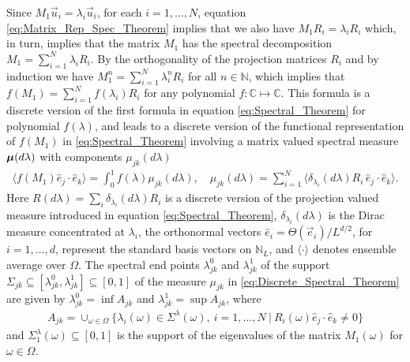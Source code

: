 \documentclass{cmslatex}
\newcommand\bmu{\mbox{\boldmath${\mu}$}}
\begin{document}
Since $M_1\vec{u}_i=\lambda_i\vec{u}_i$, for each $i=1,\ldots,N$, equation
\eqref{eq:Matrix_Rep_Spec_Theorem} implies that we also have
$M_1R_i=\lambda_iR_i$ which, in turn, implies that the matrix  $M_1$ has the
spectral decomposition $M_1=\sum_{i=1}^N\lambda_iR_i$. By the orthogonality of
the projection matrices $R_i$ and by induction we have
$M_1^n=\sum_{i=1}^N\lambda_i^nR_i$ for all $n\in\mathbb{N}$, which implies that
$f(M_1)=\sum_{i=1}^Nf(\lambda_i)R_i$ for any polynomial
$f:\mathbb{C}\mapsto\mathbb{C}$.  This formula is a discrete version of the
first formula in equation \eqref{eq:Spectral_Theorem} for polynomial
$f(\lambda)$, and leads to a discrete version of the functional
representation of  $f(M_1)$ in \eqref{eq:Spectral_Theorem} involving a
matrix valued spectral measure $\bmu(d\lambda)$ with components $\mu_{jk}(d\lambda)$
%
\begin{align}\label{eq:Discrete_Spectral_Theorem}
  \langle f(M_1)\hat{e}_j\cdot\hat{e}_k\rangle= \int_0^1f(\lambda)\mu_{jk}(d\lambda), \quad
  \mu_{jk}(d\lambda)=\sum_{i=1}^N\langle\delta_{\lambda_i}(d\lambda)R_i\,\hat{e}_j\cdot\hat{e}_k\rangle.
\end{align}
%
Here $R(d\lambda)=\sum_i\delta_{\lambda_i}(d\lambda)R_i$ is a discrete version of the
projection valued measure introduced in equation
\eqref{eq:Spectral_Theorem}, $\delta_{\lambda_i}(d\lambda)$ is the Dirac measure
concentrated at $\lambda_i$, the orthonormal vectors
$\hat{e}_i=\Theta(\vec{e}_i)/L^{d/2}$, for $i=1,\ldots,d$, represent the standard
basis vectors on $\mathbb{N}_L$, and $\langle\cdot\rangle$ denotes ensemble
average over $\Omega$. The spectral end points $\lambda_{jk}^0$ and $\lambda_{jk}^1$ of the
support $\Sigma_{jk}\subseteq[\lambda_{jk}^0,\lambda_{jk}^1]\subseteq[0,1]$ of the measure $\mu_{jk}$ in
\eqref{eq:Discrete_Spectral_Theorem} are given by
$\lambda_{jk}^0=\inf A_{jk}$ and $\lambda_{jk}^1=\sup A_{jk}$, where
%
\begin{align*}
  A_{jk}= \cup_{\omega\in\Omega}\{\lambda_i(\omega)\in\Sigma^\lambda(\omega), \   i=1,\ldots,N \ | \ R_i(\omega)\hat{e}_j\cdot\hat{e}_k\neq0\}
\end{align*}
%
and $\Sigma^\lambda_1(\omega)\subseteq[0,1]$ is the support of the eigenvalues of the matrix
$M_1(\omega)$ for $\omega\in\Omega$. 
\end{document}
